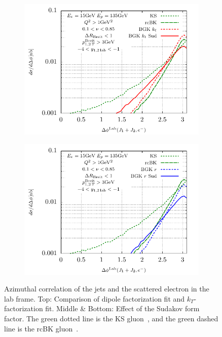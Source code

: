 \documentclass[11pt]{article}
\begin{document}
\begin{figure}[p]
	\begin{subfigure}{0.5\textwidth}
		\includegraphics[width=\textwidth]{plots/plotBGK2Lab}
	\end{subfigure}
	\begin{subfigure}{0.5\textwidth}
		\includegraphics[width=\textwidth]{plots/plotBGK3Lab}
	\end{subfigure}
\caption{ Azimuthal correlation of the jets and the scattered electron in the lab frame. Top: Comparison of dipole factorization fit and $k_T$-factorization fit. Middle \& Bottom: Effect of the Sudakov form factor. The green dotted line is the KS gluon~\cite{vanHameren:2021sqc}, and the green dashed line is the rcBK gluon~\cite{Hentschinski:2022rsa}.}
\label{fig:je-lab}
\end{figure}
\end{document}
